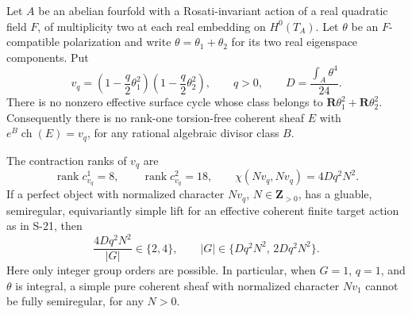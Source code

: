 \begin{proposition}
\label{prop:semireg-rm-balanced-obstruction}
Let $A$ be an abelian fourfold with a Rosati-invariant action
of a real quadratic field $F$, of multiplicity two at each
real embedding on $H^0(T_A)$. Let $\theta$ be an $F$-compatible
polarization and write $\theta=\theta_1+\theta_2$ for its two
real eigenspace components. Put
\[
 v_q=\left(1-\frac q2\theta_1^2\right)
       \left(1-\frac q2\theta_2^2\right),
 \qquad q>0,
 \qquad D=\frac{\int_A\theta^4}{24}.
 \tag{S22.1}
\]
There is no nonzero effective surface cycle whose class
belongs to $\mathbf R\theta_1^2+\mathbf R\theta_2^2$.
Consequently there is no rank-one torsion-free coherent
sheaf $E$ with $e^B\operatorname{ch}(E)=v_q$, for any
rational algebraic divisor class $B$.

The contraction ranks of $v_q$ are
\[
 \operatorname{rank}c_{v_q}^1=8,
 \qquad \operatorname{rank}c_{v_q}^2=18,
 \qquad \chi(Nv_q,Nv_q)=4Dq^2N^2.
 \tag{S22.2}
\]
If a perfect object with normalized character $Nv_q$,
$N\in\mathbf Z_{>0}$, has a gluable, semiregular, equivariantly simple
lift for an effective coherent finite target action as in
S-21, then
\[
 \frac{4Dq^2N^2}{|G|}\in\{2,4\},
 \qquad |G|\in\{Dq^2N^2,\,2Dq^2N^2\}.
 \tag{S22.3}
\]
Here only integer group orders are possible. In particular,
when $G=1$, $q=1$, and $\theta$ is integral, a simple pure
coherent sheaf with normalized character $Nv_1$ cannot be
fully semiregular, for any $N>0$.
\end{proposition}

